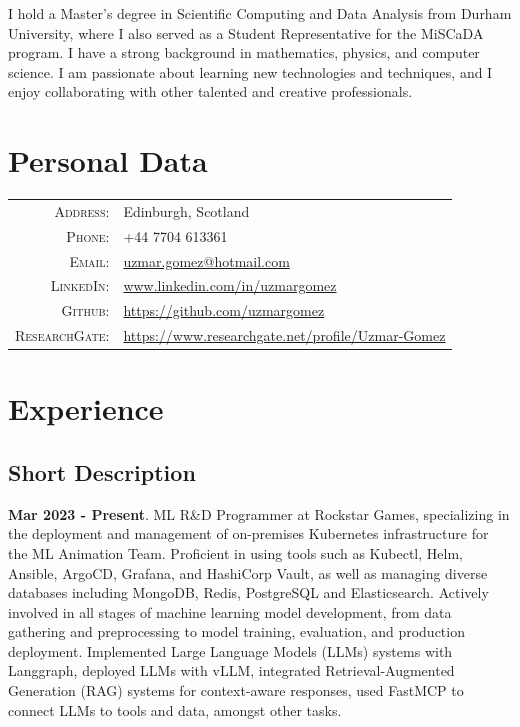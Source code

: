 \documentclass[a4paper,10pt]{article} %
\begin{document}
I hold a Master's degree in Scientific Computing and Data Analysis from Durham University, where I also served as a Student Representative for the MiSCaDA program. I have a strong background in mathematics, physics, and computer science. I am passionate about learning new technologies and techniques, and I enjoy collaborating with other talented and creative professionals.

\bigskip
\section{Personal Data}
\bigskip
\begin{tabular}{rl}
\textsc{Address:} & Edinburgh, Scotland \\
\textsc{Phone:} & +44 7704 613361\\
\textsc{Email:} & \href{mailto:uzmar.gomez@hotmail.com}{uzmar.gomez@hotmail.com}\\
\textsc{LinkedIn:} & \href{www.linkedin.com}{www.linkedin.com/in/uzmargomez}\\
\textsc{Github:} & \href{https://github.com/uzmargomez}{https://github.com/uzmargomez}\\
\textsc{ResearchGate:} & \href{https://www.researchgate.net/profile/Uzmar-Gomez}{https://www.researchgate.net/profile/Uzmar-Gomez}
\end{tabular}
\bigskip


\section{Experience}
\bigskip

\subsection{Short Description}
\vspace{0.2cm}

\textbf{Mar 2023 - Present}. ML R\&D Programmer at Rockstar Games, specializing in the deployment and management of on-premises Kubernetes infrastructure for the ML Animation Team. Proficient in using tools such as Kubectl, Helm, Ansible, ArgoCD, Grafana, and HashiCorp Vault, as well as managing diverse databases including MongoDB, Redis, PostgreSQL and Elasticsearch. Actively involved in all stages of machine learning model development, from data gathering and preprocessing to model training, evaluation, and production deployment. Implemented Large Language Models (LLMs) systems with Langgraph, deployed LLMs with vLLM, integrated Retrieval-Augmented Generation (RAG) systems for context-aware responses, used FastMCP to connect LLMs to tools and data, amongst other tasks.
\end{document}
